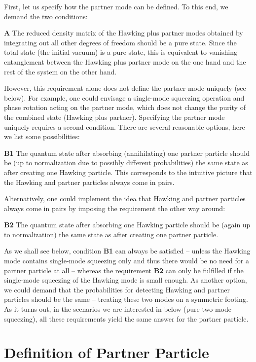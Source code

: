 \documentclass[aps,prd,showpacs,amssymb,nofootinbib,12pt]{revtex4-2}
\begin{document}
First, let us specify how the partner mode can be defined.
%
To this end, we demand the two conditions: 

{\bf A}
The reduced density matrix of the Hawking plus partner modes obtained by 
integrating out all other degrees of freedom should be a pure state.
%
Since the total state (the initial vacuum) is a pure state, this is equivalent 
to vanishing entanglement between the Hawking plus partner mode 
on the one hand and the rest of the system on the other hand. 

However, this requirement alone does not define the partner mode uniquely 
(see below).
%
For example, one could envisage a single-mode squeezing operation
and phase rotation acting on the partner mode, which does not change 
the purity of the combined state (Hawking plus partner). 
%
Specifying the partner mode uniquely requires a second condition. 
%
There are several reasonable options, here we list some possibilities:  

{\bf B1}
The quantum state after absorbing (annihilating) one partner particle 
should be (up to normalization due to possibly different probabilities)
the same state as after creating one Hawking particle.
%
This corresponds to the intuitive picture that the Hawking and partner 
particles always come in pairs. 

Alternatively, one could implement the idea that  Hawking and partner 
particles always come in pairs by imposing the requirement the 
other way around: 

{\bf B2}
The quantum state after absorbing one Hawking particle should be 
(again up to normalization)
the same state as after creating one partner particle.

As we shall see below, condition {\bf B1} can always be satisfied -- 
unless the Hawking mode contains single-mode squeezing only and 
thus there would be no need for a partner particle at all -- 
whereas the requirement {\bf B2} can only be fulfilled if the 
single-mode squeezing of the Hawking mode is small enough. 
%
As another option, we could demand that the probabilities for detecting 
Hawking and partner particles should be the same -- treating these 
two modes on a symmetric footing. 
%
As it turns out, in the scenarios we are interested in below 
(pure two-mode squeezing), all these requirements yield the same 
answer for the partner particle. 

\section{Definition of Partner Particle}\label{Definition-Partner}
\end{document}
